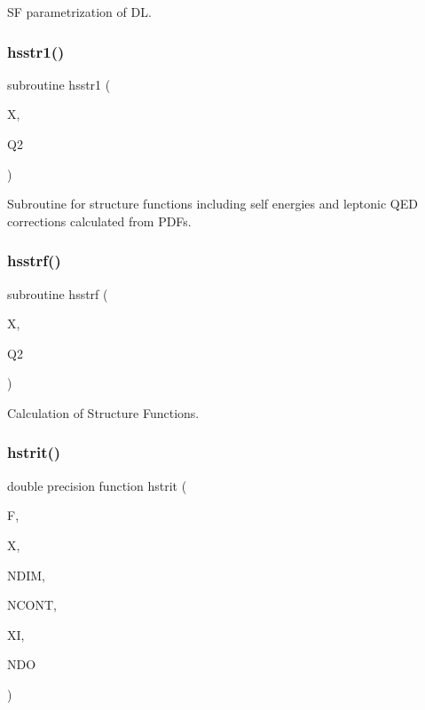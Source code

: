 SF parametrization of DL. 

\mbox{\label{djangoh__h_8f_a5ea260f0282ee195444dff4b25214298}} 
\subsubsection{\texorpdfstring{hsstr1()}{hsstr1()}}
{\footnotesize\ttfamily subroutine hsstr1 (\begin{DoxyParamCaption}\item[{}]{X,  }\item[{}]{Q2 }\end{DoxyParamCaption})}



Subroutine for structure functions including self energies and leptonic Q\+ED corrections calculated from P\+D\+Fs. 

\mbox{\label{djangoh__h_8f_aec939475b71b9ae0e410cb2a51bfd50a}} 
\subsubsection{\texorpdfstring{hsstrf()}{hsstrf()}}
{\footnotesize\ttfamily subroutine hsstrf (\begin{DoxyParamCaption}\item[{}]{X,  }\item[{}]{Q2 }\end{DoxyParamCaption})}



Calculation of Structure Functions. 

\mbox{\label{djangoh__h_8f_a190b7128662078959f32a6f61d17ef7f}} 
\subsubsection{\texorpdfstring{hstrit()}{hstrit()}}
{\footnotesize\ttfamily double precision function hstrit (\begin{DoxyParamCaption}\item[{external}]{F,  }\item[{dimension(ndim)}]{X,  }\item[{}]{N\+D\+IM,  }\item[{}]{N\+C\+O\+NT,  }\item[{dimension(50,ndim)}]{XI,  }\item[{}]{N\+DO }\end{DoxyParamCaption})}

